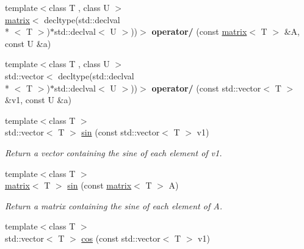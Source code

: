 \begin{DoxyCompactItemize}
\item 
\hypertarget{namespacekeycpp_a3852c35cfcc8caa784465a26d04c68a1}{{\footnotesize template$<$class T , class U $>$ }\\\hyperlink{classkeycpp_1_1matrix}{matrix}$<$ decltype(std\-::declval\\*
$<$ T $>$)$\ast$std\-::declval$<$ U $>$))$>$ {\bfseries operator/} (const \hyperlink{classkeycpp_1_1matrix}{matrix}$<$ T $>$ \&A, const U \&a)}\label{namespacekeycpp_a3852c35cfcc8caa784465a26d04c68a1}

\item 
\hypertarget{namespacekeycpp_a394f23f09cf122a8e8c20a7afd40f58e}{{\footnotesize template$<$class T , class U $>$ }\\std\-::vector$<$ decltype(std\-::declval\\*
$<$ T $>$)$\ast$std\-::declval$<$ U $>$))$>$ {\bfseries operator/} (const std\-::vector$<$ T $>$ \&v1, const U \&a)}\label{namespacekeycpp_a394f23f09cf122a8e8c20a7afd40f58e}

\item 
\hypertarget{namespacekeycpp_a1ebc4ddf6e567714f63f0dbb8a984745}{{\footnotesize template$<$class T $>$ }\\std\-::vector$<$ T $>$ \hyperlink{namespacekeycpp_a1ebc4ddf6e567714f63f0dbb8a984745}{sin} (const std\-::vector$<$ T $>$ v1)}\label{namespacekeycpp_a1ebc4ddf6e567714f63f0dbb8a984745}

\begin{DoxyCompactList}\small\item\em Return a vector containing the sine of each element of v1. \end{DoxyCompactList}\item 
\hypertarget{namespacekeycpp_a159a28c69282a740e381465a0e71bf23}{{\footnotesize template$<$class T $>$ }\\\hyperlink{classkeycpp_1_1matrix}{matrix}$<$ T $>$ \hyperlink{namespacekeycpp_a159a28c69282a740e381465a0e71bf23}{sin} (const \hyperlink{classkeycpp_1_1matrix}{matrix}$<$ T $>$ A)}\label{namespacekeycpp_a159a28c69282a740e381465a0e71bf23}

\begin{DoxyCompactList}\small\item\em Return a matrix containing the sine of each element of A. \end{DoxyCompactList}\item 
\hypertarget{namespacekeycpp_afaf5c65950c36d6a10e2fc42cae7b041}{{\footnotesize template$<$class T $>$ }\\std\-::vector$<$ T $>$ \hyperlink{namespacekeycpp_afaf5c65950c36d6a10e2fc42cae7b041}{cos} (const std\-::vector$<$ T $>$ v1)}\label{namespacekeycpp_afaf5c65950c36d6a10e2fc42cae7b041}


\end{DoxyCompactItemize}
